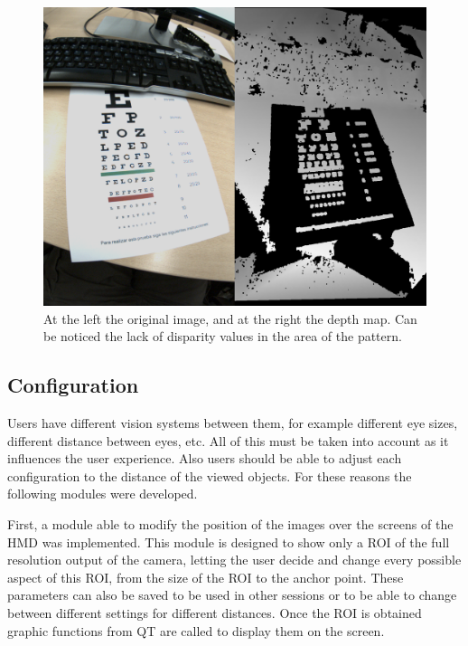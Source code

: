 \documentclass[10pt,a4paper,twocolumn,twoside]{article}
\begin{document}
 	\begin{figure}
 		\centering
 		\includegraphics[width=\linewidth]{img/depthdistort.png}
 		\caption{At the left the original image, and at the right the depth map. Can be noticed the lack of disparity values in the area of the pattern.}
 		\label{fig:disparity}
 \end{figure}
	 
	 
	 
	\subsection{Configuration}
	
	Users have different vision systems between them, for example different eye sizes, different distance between eyes, etc. All of this must be taken into account as it influences the user experience. Also users should be able to adjust each configuration to the distance of the viewed objects.  For these reasons the following modules were developed.
	
	First, a module able to modify the position of the images over the screens of the HMD was implemented. This module is designed to show only a ROI of the full resolution output of the camera, letting the user decide and change every possible aspect of this ROI, from the size of the ROI to the anchor point. These parameters can also be saved to be used in other sessions or to be able to change between different settings for different distances. Once the ROI is obtained graphic functions from QT are called to display them on the screen.
	
\end{document}
